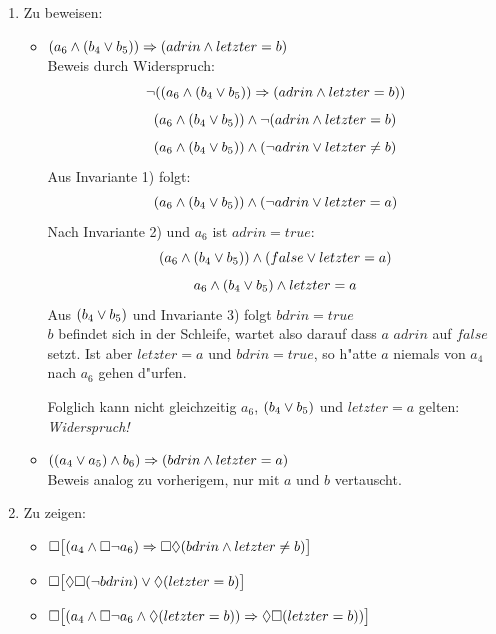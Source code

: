 \documentclass[a4paper,twoside,12pt]{article}
\begin{document}
\begin{description}
\begin{enumerate}
	\item Zu beweisen:
	\begin{itemize}
		\item $(a_6 \wedge (b_4 \vee b_5)) \Rightarrow (adrin \wedge letzter = b)$\\
			Beweis durch Widerspruch:
			\[ \neg((a_6 \wedge (b_4 \vee b_5)) \Rightarrow (adrin \wedge letzter = b)) \]
			\[ (a_6 \wedge (b_4 \vee b_5)) \wedge \neg (adrin \wedge letzter = b) \]
			\[ (a_6 \wedge (b_4 \vee b_5)) \wedge (\neg adrin \vee letzter \neq b) \]
			Aus Invariante 1) folgt:
			\[ (a_6 \wedge (b_4 \vee b_5)) \wedge (\neg adrin \vee letzter = a) \]
			Nach Invariante 2) und $a_6$ ist $adrin = true$:
			\[ (a_6 \wedge (b_4 \vee b_5)) \wedge (false \vee letzter = a) \]
			\[ a_6 \wedge (b_4 \vee b_5) \wedge letzter = a \]
			Aus $(b_4 \vee b_5)$ und Invariante 3) folgt $bdrin = true$\\
			$b$ befindet sich in der Schleife, wartet also darauf dass $a$
			$adrin$ auf $false$ setzt. Ist aber $letzter = a$ und $bdrin = true$,
			so h"atte $a$ niemals von $a_4$ nach $a_6$ gehen d"urfen.

			Folglich kann nicht gleichzeitig $a_6$, $(b_4 \vee b_5)$ und $letzter = a$ gelten:\\
			\emph{Widerspruch!}

		\item $((a_4 \vee a_5) \wedge b_6) \Rightarrow (bdrin \wedge letzter = a)$\\
			Beweis analog zu vorherigem, nur mit $a$ und $b$ vertauscht.
	\end{itemize}
	\item Zu zeigen:
	\begin{itemize}
		\item $\Box \big [(a_4 \wedge \Box \neg a_6) \Rightarrow \Box \lozenge (bdrin \wedge letzter \neq b) \big ]$
		\item $\Box \big [\lozenge \Box (\neg bdrin) \vee \lozenge (letzter = b) \big]$
		\item $\Box \big [(a_4 \wedge \Box \neg a_6 \wedge \lozenge (letzter = b)) \Rightarrow \lozenge \Box (letzter = b)) \big ]$
	\end{itemize}
\end{enumerate}

\end{description}
\end{document}
